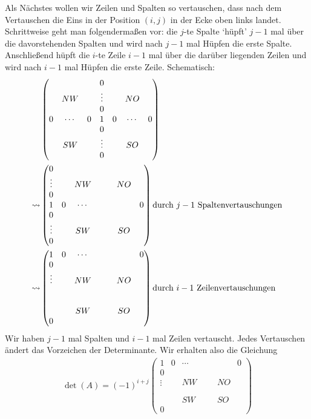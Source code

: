 Als Nächstes wollen wir Zeilen und Spalten so vertauschen, dass nach dem Vertauschen die Eins in der Position $(i,j)$ in der Ecke oben links landet. Schrittweise geht man folgendermaßen vor: die $j$-te Spalte `hüpft' $j-1$ mal über die davorstehenden Spalten und wird nach $j-1$ mal Hüpfen die erste Spalte. Anschließend hüpft die $i$-te Zeile $i-1$ mal über die darüber liegenden Zeilen und wird  nach $i-1$ mal Hüpfen die erste Zeile. Schematisch: 
\begin{align*}
	&\begin{pmatrix}
		&&& 0 &&& \\
		& NW && \vdots && NO & \\
		&&& 0 &&& \\
		0 & \cdots & 0 & 1 & 0 & \cdots & 0 \\
		&&& 0 &&& \\
		& SW && \vdots && SO & \\
		&&& 0 &&&
	\end{pmatrix} \\
	\rightsquigarrow
	&\begin{pmatrix}
		0 &&&&&& \\
		\vdots && NW &&& NO & \\
		0 &&&&&& \\
		1 & 0 & \cdots &&&& 0 \\
		0 &&&&&& \\
		\vdots && SW &&& SO & \\
		0 &&&&&&
	\end{pmatrix}
	\text{durch $ j-1 $ Spaltenvertauschungen} \\
	\rightsquigarrow
	&\begin{pmatrix}
		1 & 0 & \cdots &&&& 0 \\
		0 &&&&&& \\
		\vdots && NW &&& NO & \\
		&&&&&& \\
		&&&&&& \\
		&& SW &&& SO & \\
		0 &&&&&&
	\end{pmatrix}
	\text{durch $ i-1 $ Zeilenvertauschungen}
\end{align*}
Wir haben $j-1$ mal Spalten und $i-1$ mal Zeilen vertauscht. Jedes Vertauschen ändert das Vorzeichen der Determinante. Wir erhalten also die Gleichung 
\begin{align*}
	\det(A) = (-1)^{i+j}
	\begin{pmatrix}
	1 & 0 & \cdots &&&& 0 \\
	0 &&&&&& \\
	\vdots && NW &&& NO & \\
	&&&&&& \\
	&&&&&& \\
	&& SW &&& SO & \\
	0 &&&&&&
	\end{pmatrix}
\end{align*}

